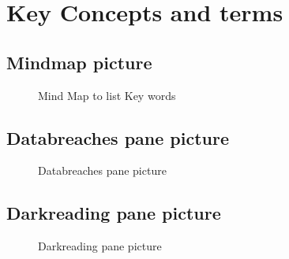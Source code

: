 
\chapter{Key Concepts and terms} %

\label{AppendixChapter3} 


\section{Mindmap picture}
\begin{figure}[ht]
    \centering
    \caption{Mind Map to list Key words}
    \label{fig:info-intel}
\end{figure}
\FloatBarrier

\section{Databreaches pane picture}
\begin{figure}[ht]
    \centering
    \caption{Databreaches pane picture}
    \label{fig:databreaches}
\end{figure}
\FloatBarrier

\section{Darkreading pane picture}
\begin{figure}[ht]
    \centering
    \caption{Darkreading pane picture}
    \label{fig:darkreading}
\end{figure}
\FloatBarrier